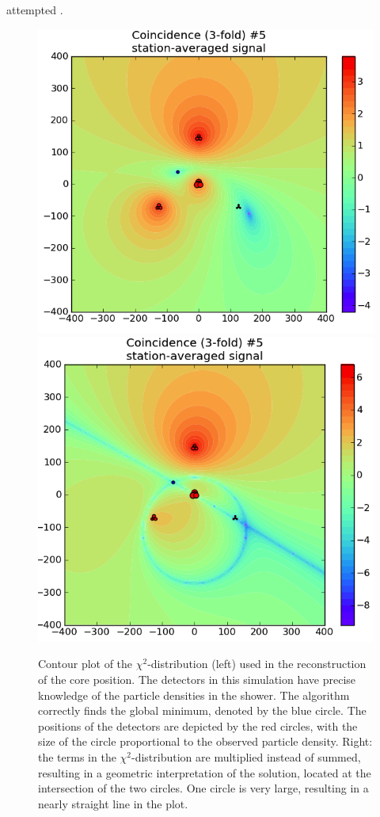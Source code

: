 attempted \cite{Montanus:2010}.
\begin{figure}
\centering
\includegraphics[width=.48\linewidth]{raw-plots/plot_core_chi_sq.png}
\includegraphics[width=.48\linewidth]{raw-plots/plot_core_chi_sq_alt.png}
\caption{Contour plot of the $\chi^2$-distribution (left) used in the
reconstruction of the core position. The detectors in this simulation have
precise knowledge of the particle densities in the shower. The algorithm
correctly finds the global minimum, denoted by the blue circle. The
positions of the detectors are depicted by the red circles, with the size
of the circle proportional to the observed particle density. Right: the
terms in the $\chi^2$-distribution are multiplied instead of summed,
resulting in a geometric interpretation of the solution, located at the
intersection of the two circles. One circle is very large, resulting in a
nearly straight line in the plot.}
\label{fig:core-one}
\end{figure}

